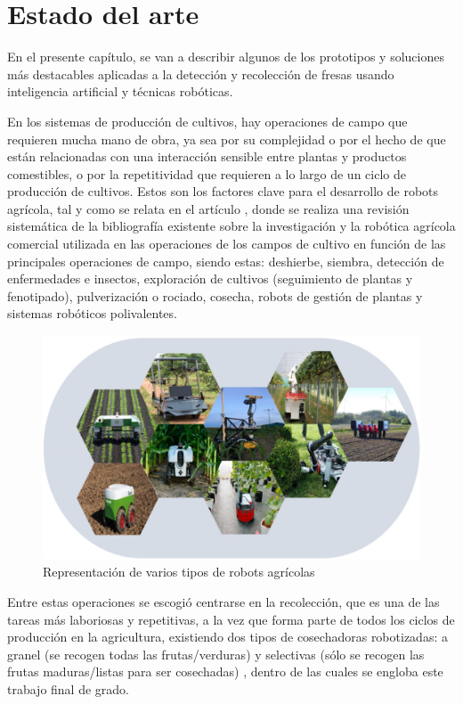 \chapter{Estado del arte}
\label{cap:capitulo2}
	
En el presente capítulo, se van a describir algunos de los prototipos y soluciones más destacables aplicadas a la detección y recolección de fresas usando inteligencia artificial y técnicas robóticas.

En los sistemas de producción de cultivos, hay operaciones de campo que requieren mucha mano de obra, ya sea por su complejidad o por el hecho de que están relacionadas con una interacción sensible entre plantas y productos comestibles, o por la repetitividad que requieren a lo largo de un ciclo de producción de cultivos. Estos son los factores clave para el desarrollo de robots agrícola, tal y como se relata en el artículo \cite{Fountas20}, donde se realiza una revisión sistemática de la bibliografía existente sobre la investigación y la robótica agrícola comercial utilizada en las operaciones de los campos de cultivo en función de las principales operaciones de campo, siendo estas: deshierbe, siembra, detección de enfermedades e insectos, exploración de cultivos (seguimiento de plantas y fenotipado), pulverización o rociado, cosecha, robots de gestión de plantas y sistemas robóticos polivalentes.

\begin{figure} [H]
    \begin{center}
      \includegraphics[width=12cm]{figs/Representación robots agrícolas.png}
    \end{center}
    \caption{Representación de varios tipos de robots agrícolas}
    \label{fig:Robots_agricolas}
\end{figure}

Entre estas operaciones se escogió centrarse en la recolección, que es una de las tareas más laboriosas y repetitivas, a la vez que forma parte de todos los ciclos de producción en la agricultura, existiendo dos tipos de cosechadoras robotizadas: a granel (se recogen todas las frutas/verduras) y selectivas (sólo se recogen las frutas maduras/listas para ser cosechadas) \cite{Fountas20}, dentro de las cuales se engloba este trabajo final de grado. 


